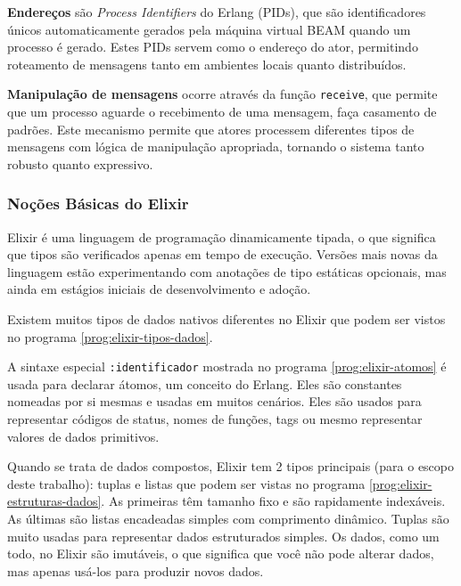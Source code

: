 \textbf{Endereços} são \emph{Process Identifiers} do Erlang (PIDs), que são identificadores únicos automaticamente gerados pela máquina virtual BEAM quando um processo é gerado. Estes PIDs servem como o endereço do ator, permitindo roteamento de mensagens tanto em ambientes locais quanto distribuídos.

\textbf{Manipulação de mensagens} ocorre através da função \texttt{receive}, que permite que um processo aguarde o recebimento de uma mensagem, faça casamento de padrões. Este mecanismo permite que atores processem diferentes tipos de mensagens com lógica de manipulação apropriada, tornando o sistema tanto robusto quanto expressivo.

\subsubsection{Noções Básicas do Elixir}

Elixir é uma linguagem de programação dinamicamente tipada, o que significa que tipos são verificados apenas em tempo de execução. Versões mais novas da linguagem estão experimentando com anotações de tipo estáticas opcionais, mas ainda em estágios iniciais de desenvolvimento e adoção.

Existem muitos tipos de dados nativos diferentes no Elixir que podem ser vistos no programa \ref{prog:elixir-tipos-dados}.

\begin{program}
  
  \caption{Tipos de Dados em Elixir.\label{prog:elixir-tipos-dados}}
\end{program}

A sintaxe especial \texttt{:identificador} mostrada no programa \ref{prog:elixir-atomos} é usada para declarar átomos, um conceito do Erlang. Eles são constantes nomeadas por si mesmas e usadas em muitos cenários. Eles são usados para representar códigos de status, nomes de funções, tags ou mesmo representar valores de dados primitivos.

\begin{program}
  
  \caption{Átomos em Elixir.\label{prog:elixir-atomos}}
\end{program}

Quando se trata de dados compostos, Elixir tem 2 tipos principais (para o escopo deste trabalho): tuplas e listas que podem ser vistas no programa \ref{prog:elixir-estruturas-dados}. As primeiras têm tamanho fixo e são rapidamente indexáveis. As últimas são listas encadeadas simples com comprimento dinâmico. Tuplas são muito usadas para representar dados estruturados simples. Os dados, como um todo, no Elixir são imutáveis, o que significa que você não pode alterar dados, mas apenas usá-los para produzir novos dados.

